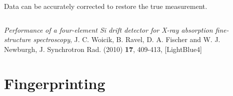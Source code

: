 \documentclass[10pt, xcolor=x11names, compress]{beamer}
\begin{document}
\begin{frame}
\begin{columns}[T]
\begin{column}{0.5\linewidth}
\begin{center}
        Data can be accurately corrected to restore the true measurement.
      \end{center}
    \end{column}
  \end{columns}
  \begin{bottomnote}[0.5][18.5]
    \textit{Performance of a four-element Si drift detector for X-ray
      absorption fine-structure spectroscopy}, J. C. Woicik, B. Ravel,
    D. A. Fischer and W. J. Newburgh, J. Synchrotron Rad. (2010)
    \textbf{17}, 409-413,
    [LightBlue4]
  \end{bottomnote}
\end{frame}

\section[Fingerprinting]{Fingerprinting}
\end{document}
